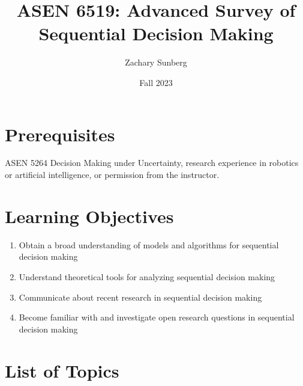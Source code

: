 \documentclass[9pt]{article}
\title{ASEN 6519: Advanced Survey of Sequential Decision Making}
\author{Zachary Sunberg}
\date{Fall 2023}
\begin{document}
\maketitle

\section*{Prerequisites}

ASEN 5264 Decision Making under Uncertainty, research experience in robotics or artificial intelligence, or permission from the instructor.

\section*{Learning Objectives}

\begin{enumerate}[nosep]
    \item Obtain a broad understanding of models and algorithms for sequential decision making
    \item Understand theoretical tools for analyzing sequential decision making
    \item Communicate about recent research in sequential decision making
    \item Become familiar with and investigate open research questions in sequential decision making
\end{enumerate}

\section*{List of Topics}

\end{document}
